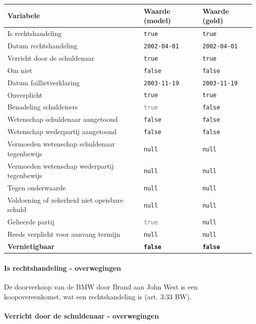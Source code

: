 \documentclass[
  dutch,
  a4paper,
]{article}
\begin{document}
\begin{center}
\small
\begin{tabular}{@{}p{7.4cm}p{2.6cm}p{2.6cm}@{}}
\toprule
Variabele & Waarde (model) & Waarde (gold) \\
\midrule
Is rechtshandeling & \texttt{true} & \texttt{true} \\
Datum rechtshandeling & \texttt{2002-04-01} & \texttt{2002-04-01} \\
Verricht door de schuldenaar & \texttt{true} & \texttt{true} \\
Om niet & \texttt{false} & \texttt{false} \\
Datum faillietverklaring & \texttt{2003-11-19} & \texttt{2003-11-19} \\
Onverplicht & \texttt{true} & \texttt{true} \\
Benadeling schuldeisers & \textcolor{gray}{\texttt{true}} & \texttt{false} \\
Wetenschap schuldenaar aangetoond & \texttt{false} & \texttt{false} \\
Wetenschap wederpartij aangetoond & \texttt{false} & \texttt{false} \\
Vermoeden wetenschap schuldenaar tegenbewijs & \texttt{null} & \texttt{null} \\
Vermoeden wetenschap wederpartij tegenbewijs & \texttt{null} & \texttt{null} \\
Tegen onderwaarde & \texttt{null} & \texttt{null} \\
Voldoening of zekerheid niet opeisbare schuld & \texttt{null} & \texttt{null} \\
Gelieerde partij & \textcolor{gray}{\texttt{true}} & \texttt{null} \\
Reeds verplicht voor aanvang termijn & \texttt{null} & \texttt{null} \\
\textbf{Vernietigbaar} & \textbf{\texttt{false}} & \textbf{\texttt{false}} \\
\bottomrule
\end{tabular}
\end{center}

\paragraph{Is rechtshandeling - overwegingen}\label{is-rechtshandeling---overwegingen-57}

De doorverkoop van de BMW door Brand aan John West is een koopovereenkomst, wat een rechtshandeling is (art. 3:33 BW).

\paragraph{Verricht door de schuldenaar - overwegingen}\label{verricht-door-de-schuldenaar---overwegingen-57}
\end{document}
